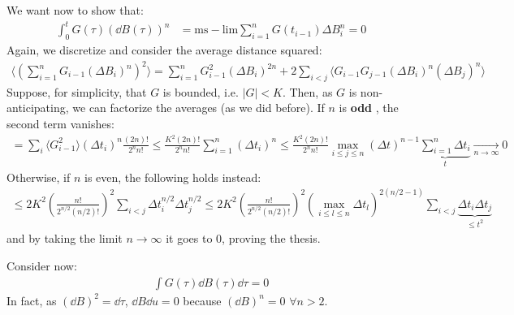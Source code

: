 \documentclass[../template.tex]{subfiles}
\begin{document}
\begin{example}
    We want now to show that:
    \begin{align*}
        \int_0^t G(\tau) (\dd{B}(\tau))^n &= \mathrm{ms-lim} \sum_{i=1}^n G(t_{i-1}) \Delta B_i^n = 0  
    \end{align*}
    Again, we discretize and consider the average distance squared:
    \begin{align*}
        \langle \left(\sum_{i=1}^n G_{i-1} (\Delta B_i)^n\right)^2  \rangle = \sum_{i=1}^n G_{i-1}^2 (\Delta B_i)^{2n} + 2 \sum_{i< j} \langle G_{i-1} G_{j-1} (\Delta B_i)^n (\Delta B_j)^n \rangle
    \end{align*}
    Suppose, for simplicity, that $G$ is bounded, i.e. $|G| < K$. Then, as $G$ is non-anticipating, we can factorize the averages (as we did before). If $n$ is \textbf{odd} , the second term vanishes: 
    \begin{align*}
        = \sum_i \langle G_{i-1}^2 \rangle (\Delta t_i)^n \frac{(2n)!}{2^n n!} \leq \frac{K^2(2n)!}{2^n n!} \sum_{i=1}^n (\Delta t_i)^n  \leq \frac{K^2 (2n)!}{2^n n!} \max_{i \leq j \leq n} (\Delta t)^{n-1} \underbrace{\sum_{i=1}^n \Delta t_i}_{t}  \xrightarrow[n \to \infty]{}  0
    \end{align*}  
    Otherwise, if $n$ is even, the following holds instead:
    \begin{align*}
        \leq 2K^2 \left(\frac{n!}{2^{n/2}(n/2)!} \right)^2 \sum_{i< j} \Delta t_i^{n/2} \Delta t_j^{n/2} \leq 2K^2 \left(\frac{n!}{2^{n/2} (n/2)!} \right)^2 \left(\max_{i \leq l \leq n} \Delta t_l\right)^{2(n/2-1)} \sum_{i< j} \underbrace{\Delta t_i \Delta t_j}_{\leq t^2} 
    \end{align*}
    and by taking the limit $n \to \infty$ it goes to $0$, proving the thesis.  
\end{example}

\begin{example}
    Consider now:
    \begin{align*}
        \int G(\tau) \dd{B(\tau)} \dd{\tau} = 0
    \end{align*}
    In fact, as $(\dd{B})^2 = \dd{\tau}$, $\dd{B}\dd{u} = 0$ because $(\dd{B})^n = 0$ $\forall n > 2$.  
\end{example}
\end{document}
